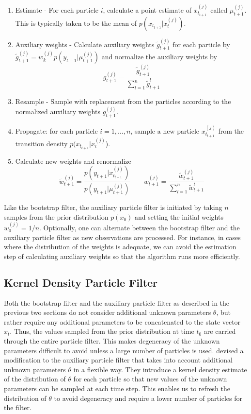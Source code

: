 \documentclass{article}
\begin{document}
\begin{enumerate}
\item Estimate - For each particle $i$, calculate a point estimate of $x_{t_{t+1}}^{(j)}$ called $\mu_{t+1}^{(j)}$.  This is typically taken to be the mean of $p(x_{t_{t+1}}|x_t^{(j)})$.
\item Auxiliary weights - Calculate auxiliary weights $\tilde{g}_{t+1}^{(j)}$ for each particle by $\tilde{g}_{t+1}^{(j)} = w_k^{(j)} p(y_{t+1}|\mu_{t+1}^{(j)})$ and normalize the auxiliary weights by \[g_{t+1}^{(j)} = \frac{\tilde{g}_{t+1}^{(j)}}{\sum_{l=1}^n \tilde{g}_{t+1}^l}\]
\item Resample - Sample with replacement from the particles according to the normalized auxiliary weights $g_{t+1}^{(j)}$.
\item Propagate: for each particle $i = {1,\ldots,n}$, sample a new particle $x_{t_{t+1}}^{(j)}$ from the transition density $p(x_{t_{t+1}}|x_t^{(j)}$).
\item Calculate new weights and renormalize 
\[\tilde{w}_{t+1}^{(j)} = \frac{p(y_{t+1}|x_{t_{t+1}}^{(j)})}{p(y_{t+1}|\mu_{t+1}^{(j)})} \qquad w_{t+1}^{(j)} = \frac{\tilde{w}_{t+1}^{(j)}}{\sum_{l=1}^n \tilde{w}_{t+1}^l}\]
\end{enumerate}

\noindent Like the bootstrap filter, the auxiliary particle filter is initiated by taking $n$ samples from the prior distribution $p(x_0)$ and setting the initial weights $w_0^{(j)} = 1/n$.  Optionally, one can alternate between the bootstrap filter and the auxiliary particle filter as new observations are processed.  For instance, in cases where the distribution of the weights is adequate, we can avoid the estimation step of calculating auxiliary weights so that the algorithm runs more efficiently.

\subsection{Kernel Density Particle Filter}

Both the bootstrap filter and the auxiliary particle filter as described in the previous two sections do not consider additional unknown parameters $\theta$, but rather require any additional parameters to be concatenated to the state vector $x_t$.  Thus, the values sampled from the prior distribution at time $t_0$ are carried through the entire particle filter.  This makes degeneracy of the unknown parameters difficult to avoid unless a large number of particles is used.  \citet{Liu:West:comb:2001} devised a modification to the auxiliary particle filter that takes into account additional unknown parameters $\theta$ in a flexible way.  They introduce a kernel density estimate of the distribution of $\theta$ for each particle so that new values of the unknown parameters can be sampled at each time step.  This enables us to refresh the distribution of $\theta$ to avoid degeneracy and require a lower number of particles for the filter.
\end{document}
